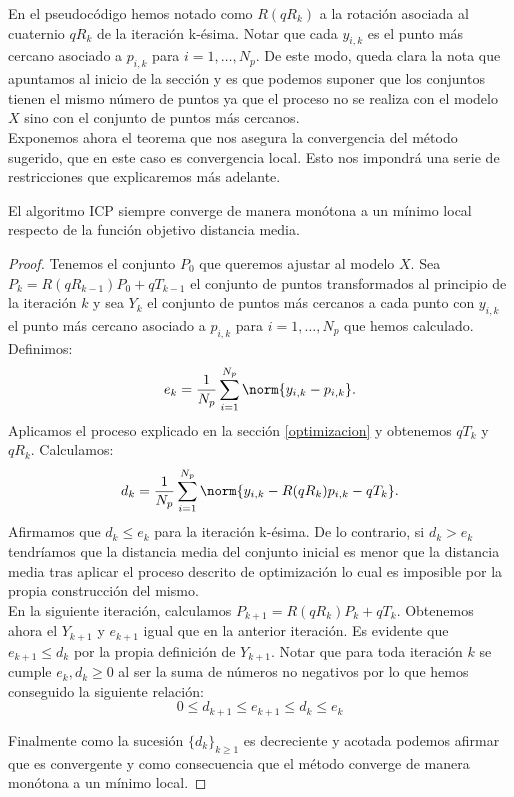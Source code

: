 En el pseudocódigo hemos notado como $  R(qR_{k}) $ a la rotación asociada al cuaternio $ qR_{k} $ de la iteración k-ésima. Notar que cada $ y_{i,k} $ es el punto más cercano asociado a $ p_{i,k} $ para $ i = 1,\dots, N_p $. De este modo, queda clara la nota que apuntamos al inicio de la sección y es que podemos suponer que los conjuntos tienen el mismo número de puntos ya que el proceso no se realiza con el modelo $ X $ sino con el conjunto de puntos más cercanos. \\
 
Exponemos ahora el teorema que nos asegura la convergencia del método sugerido, que en este caso es convergencia local. Esto nos impondrá una serie de restricciones que explicaremos más adelante.

\bigskip
\begin{teoremaBox}
El algoritmo ICP siempre converge de manera monótona a un mínimo local respecto de la función objetivo distancia media.
\end{teoremaBox}
\begin{proof}
Tenemos el conjunto $ P_0 $ que queremos ajustar al modelo $ X $. Sea $ P_k = R(qR_{k-1})P_0 + qT_{k-1}$ el conjunto de puntos transformados al principio de la iteración $ k $ y sea $ Y_k $ el conjunto de puntos más cercanos a cada punto con $ y_{i,k} $ el punto más cercano asociado a $ p_{i,k} $ para $ i = 1,\dots, N_p $ que hemos calculado. Definimos:
\[
e_k = \frac{1}{N_p} \sum_{i=1}^{N_p} \norm{ y_{i,k}-p_{i,k}}.
\]
Aplicamos el proceso explicado en la sección \ref{optimizacion} y obtenemos $ qT_{k} $ y $ qR_{k} $. Calculamos:
\[
d_k = \frac{1}{N_p} \sum_{i=1}^{N_p} \norm{ y_{i,k}-R(qR_{k})p_{i,k}-qT_{k}}.
\]
Afirmamos que $ d_k \leq e_k $ para la iteración k-ésima. De lo contrario, si $ d_k > e_k $ tendríamos que la distancia media del conjunto inicial es menor que la distancia media tras aplicar el proceso descrito de optimización lo cual es imposible por la propia construcción del mismo. \\

En la siguiente iteración, calculamos $ P_{k+1} = R(qR_{k})P_k + qT_{k} $. Obtenemos ahora el $ Y_{k+1} $ y $ e_{k+1} $ igual que en la anterior iteración. Es evidente que $ e_{k+1} \leq d_k $ por la propia definición de $ Y_{k+1} $. Notar que para toda iteración $ k $ se cumple $ e_k, d_k \geq 0 $ al ser la suma de números no negativos por lo que hemos conseguido la siguiente relación:
\[
0\leq d_{k+1} \leq e_{k+1} \leq d_k \leq e_k
\]

Finalmente como la sucesión $ \{d_k\}_{k \geq 1} $ es decreciente y acotada podemos afirmar que es convergente y como consecuencia que el método converge de manera monótona a un mínimo local.
\end{proof}

